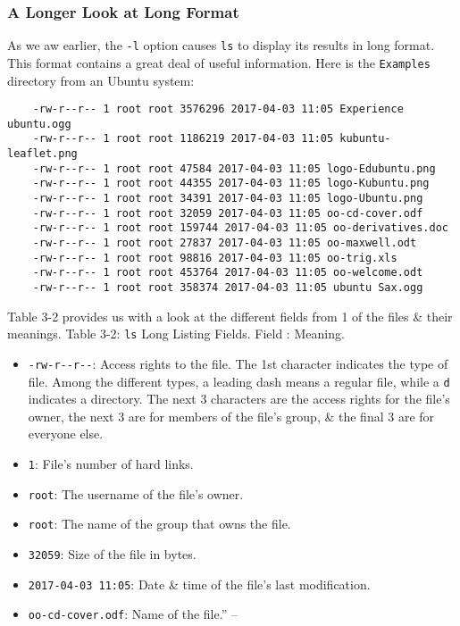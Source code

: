 \documentclass[oneside]{book}
\numberwithin{equation}{section}
\begin{document}
\subsubsection{A Longer Look at Long Format}
As we aw earlier, the \texttt{-l} option causes \texttt{ls} to display its results in long format. This format contains a great deal of useful information. Here is the \texttt{Examples} directory from an Ubuntu system:
\begin{verbatim}
	-rw-r--r-- 1 root root 3576296 2017-04-03 11:05 Experience ubuntu.ogg
	-rw-r--r-- 1 root root 1186219 2017-04-03 11:05 kubuntu-leaflet.png
	-rw-r--r-- 1 root root 47584 2017-04-03 11:05 logo-Edubuntu.png
	-rw-r--r-- 1 root root 44355 2017-04-03 11:05 logo-Kubuntu.png
	-rw-r--r-- 1 root root 34391 2017-04-03 11:05 logo-Ubuntu.png
	-rw-r--r-- 1 root root 32059 2017-04-03 11:05 oo-cd-cover.odf
	-rw-r--r-- 1 root root 159744 2017-04-03 11:05 oo-derivatives.doc
	-rw-r--r-- 1 root root 27837 2017-04-03 11:05 oo-maxwell.odt
	-rw-r--r-- 1 root root 98816 2017-04-03 11:05 oo-trig.xls
	-rw-r--r-- 1 root root 453764 2017-04-03 11:05 oo-welcome.odt
	-rw-r--r-- 1 root root 358374 2017-04-03 11:05 ubuntu Sax.ogg
\end{verbatim}
Table 3-2 provides us with a look at the different fields from 1 of the files \& their meanings. \textsf{Table 3-2: \texttt{ls} Long Listing Fields. Field : Meaning.}
\begin{itemize}
	\item \verb|-rw-r--r--|: Access rights to the file. The 1st character indicates the type of file. Among the different types, a leading dash means a regular file, while a \texttt{d} indicates a directory. The next 3 characters are the access rights for the file's owner, the next 3 are for members of the file's group, \& the final 3 are for everyone else.
	\item \texttt{1}: File's number of hard links.
	\item \texttt{root}: The username of the file's owner.
	\item \texttt{root}: The name of the group that owns the file.
	\item \texttt{32059}: Size of the file in bytes.
	\item \texttt{2017-04-03 11:05}: Date \& time of the file's last modification.
	\item \texttt{oo-cd-cover.odf}: Name of the file.'' -- \cite[pp. 53--54]{Shotts2019}
\end{itemize}
\end{document}
